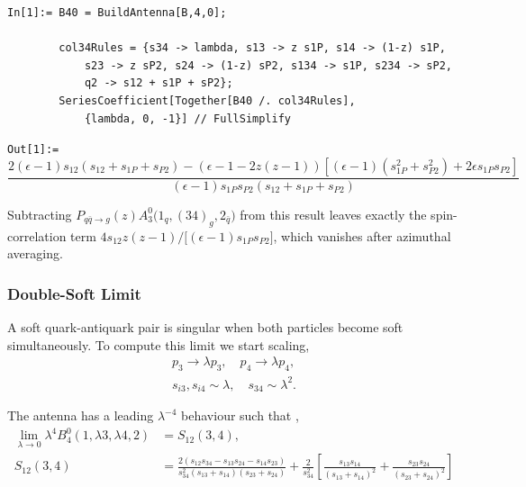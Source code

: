 \begin{mdframed}[backgroundcolor=gray!10, linewidth=0pt]
\begin{lstlisting}
In[1]:= B40 = BuildAntenna[B,4,0];

        col34Rules = {s34 -> lambda, s13 -> z s1P, s14 -> (1-z) s1P,
            s23 -> z sP2, s24 -> (1-z) sP2, s134 -> s1P, s234 -> sP2,
            q2 -> s12 + s1P + sP2};
        SeriesCoefficient[Together[B40 /. col34Rules],
            {lambda, 0, -1}] // FullSimplify
\end{lstlisting}
\texttt{Out[1]:=}
    \begin{equation*}
        \frac{2(\epsilon-1)s_{12}\left(s_{12}+s_{1P}+s_{P2}\right)-\left(\epsilon-1-2z(z-1)\right)\left[(\epsilon-1)\left(s_{1P}^2+s_{P2}^2\right)+2\epsilon s_{1P}s_{P2}\right]}{(\epsilon-1)s_{1P}s_{P2}\left(s_{12}+s_{1P}+s_{P2}\right)}
    \end{equation*}
\end{mdframed}
Subtracting $P_{q\bar q\to g}(z)A_3^0\big(1_q,(34)_g,2_{\bar q}\big)$ from this result leaves exactly the
spin-correlation term $4s_{12}z(z-1)/\big[(\epsilon-1)s_{1P}s_{P2}\big]$, which vanishes after azimuthal averaging.


\subsubsection{Double-Soft Limit}

A soft quark-antiquark pair is singular when both particles become soft simultaneously. To 
compute this limit we start scaling,
\begin{equation}
    \begin{gathered}
        p_3\to \lambda p_3,\quad p_4\to \lambda p_4,\\
        s_{i3},s_{i4}\sim\lambda,\quad s_{34}\sim\lambda^2.
    \end{gathered}
\end{equation}

The antenna has a leading $\lambda^{-4}$ behaviour such that \cite{Gehrmann-DeRidder:2005btv},
\begin{equation}
    \begin{split}
    \lim_{\lambda\to0}\lambda^4 B_4^0(1,\lambda3,\lambda4,2)&=S_{12}(3,4),\\
    S_{12}(3,4) &= \frac{2\left(s_{12}s_{34}-s_{13}s_{24}-s_{14}s_{23}\right)}{s_{34}^2(s_{13}+s_{14})(s_{23}+s_{24})}+\frac{2}{s_{34}^2}\left[\frac{s_{13}s_{14}}{(s_{13}+s_{14})^2}+\frac{s_{23}s_{24}}{(s_{23}+s_{24})^2}\right]
    \end{split}
\end{equation}

